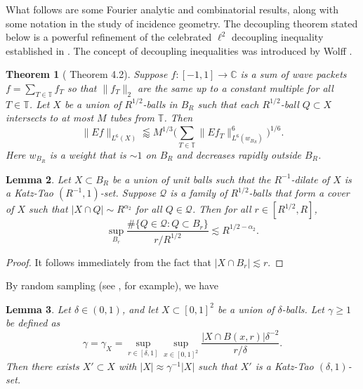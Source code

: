 \documentclass{amsart}
\numberwithin{equation}{section}
\newtheorem{theorem}{Theorem}[section]
\newtheorem{lemma}[theorem]{Lemma}
\newcommand{\al}{\alpha}
\newcommand{\ga}{\gamma}
\newcommand{\de}{\delta}
\newcommand{\cq}{\mathcal Q}
\newcommand{\ZT}{\mathbb{T}}
\newcommand{\ZC}{\mathbb{C}}
\begin{document}
\medskip
What follows are some Fourier analytic and combinatorial results, along with some notation in the study of incidence geometry.
The decoupling theorem stated below is a powerful refinement of the celebrated $\ell^2$ decoupling inequality established in \cite{Bourgain-Demeter-l2}.
The concept of decoupling inequalities was introduced by Wolff \cite{Wolff-decoupling}.


\begin{theorem}[\cite{GIOW} Theorem 4.2]
\label{refined-decoupling-thm}
Suppose $f:[-1,1]\to\ZC$ is a sum of wave packets $f=\sum_{T\in\ZT}f_T$ so that $\|f_T\|_2$ are the same up to a constant multiple for all $T\in\ZT$. 
Let $X$ be a union of $R^{1/2}$-balls in $B_R$ such that each $R^{1/2}$-ball $Q\subset X$ intersects to at most $M$ tubes from $\ZT$. 
Then 
\begin{equation}
\label{refined-decoupling}
    \|Ef\|_{L^6(X)}\lessapprox  M^{1/3}\Big(\sum_{T\in\ZT}\|Ef_T\|_{L^6(w_{B_R})}^6\Big)^{1/6}.
\end{equation}
Here $w_{B_R}$ is a weight that is $\sim1$ on $B_R$ and decreases rapidly outside $B_R$. 
\end{theorem}




\begin{lemma}
\label{katz-tao-constant-lem}
Let $X\subset B_R$ be a union of unit balls such that the $R^{-1}$-dilate of $X$ is a Katz-Tao $(R^{-1},1)$-set.
Suppose $\cq$ is a family of $R^{1/2}$-balls that form a cover of $X$ such that $|X\cap Q|\sim R^{\al_2}$ for all $Q\in\cq$.
Then for all $r\in[R^{1/2},R]$,
\begin{equation}
    \sup_{B_r}\frac{\#\{Q\in\cq: Q\subset B_r\}}{r/R^{1/2}}\lesssim R^{1/2-\al_2}.
\end{equation}
\end{lemma}
\begin{proof}
It follows immediately from the fact that $|X\cap B_r|\lesssim r$.
\end{proof}


By random sampling (see \cite[Lemma 1.6]{Wang-Wu}, for example), we have

\begin{lemma}
\label{katz-tao-set-lem}
Let $\de\in(0,1)$, and let $X\subset[0,1]^2$ be a union of $\de$-balls.
Let $\ga\geq1$ be defined as 
\begin{equation}
\label{katz-tao-constant}
    \ga=\ga_X=\sup_{r\in[\de,1]}\sup_{x\in[0,1]^2}\frac{|X\cap B(x,r)|\de^{-2}}{r/\de}.
\end{equation}
Then there exists $X'\subset X$ with $|X|\approx\ga^{-1}|X|$ such that $X'$ is a Katz-Tao $(\de,1)$-set.
\end{lemma}
\end{document}
